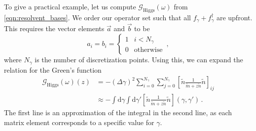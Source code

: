 \documentclass[
    reprint, 
    aps,
    preprintnumbers,
    twocolumn,
    prb,
    superscriptaddress
]{revtex4-2}
\newcommand{\dgamma}{\mathrm{d}\gamma}
\newcommand{\greens}[1]{\mathcal{G}_\text{#1} (\omega)}
\begin{document}
To give a practical example, let us compute $\greens{Higgs}$ from \eqref{eqn:resolvent_bases}.
We order our operator set such that all $f_\gamma + f_\gamma^{\dagger}$ are upfront. 
This requires the vector elements $\vec{a}$ and $\vec{b}$ to be
\begin{equation}
    a_i = b_i = \begin{cases}
        1 & i < N_\gamma \\
        0 & \text{otherwise}
    \end{cases}\,,
\end{equation}
where $N_\gamma$ is the number of discretization points.
Using this, we can expand the relation for the Green's function
\begin{align}
    \greens{Higgs} (z) &= -(\Delta \gamma)^2 \sum_{i=0}^{N_\gamma} \sum_{j=0}^{N_\gamma} \left[ \tilde{n} \frac{1}{\tilde{m} + z \tilde{n}} \tilde{n} \right]_{ij} \nonumber \\
        &\approx - \int \dgamma \int \dgamma' \left[ \tilde{n} \frac{1}{\tilde{m} + z \tilde{n}} \tilde{n} \right](\gamma, \gamma')\,.
\end{align}
The first line is an approximation of the integral in the second line, as each matrix element corresponds to a specific value for $\gamma$.




%
		
\end{document}
